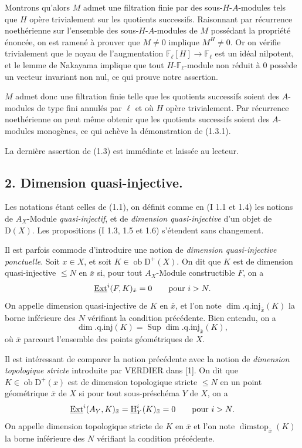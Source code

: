 \documentclass[11pt]{article}
\providecommand{\uH}{\underline{\mathrm H}}
\DeclareMathOperator{\Ext}{Ext}
\newcommand{\D}{\mathrm{D}}
\newcommand{\F}{\mathbb{F}}
\newcommand{\ob}{\operatorname{ob}}
\providecommand{\ob}{\operatorname{ob}}
\begin{document}
Montrons qu'alors $M$ admet une filtration finie par des sous-$H$-$A$-modules tels que $H$ opère trivialement sur les quotients successifs. Raisonnant par récurrence noethérienne sur l'ensemble des sous-$H$-$A$-modules de $M$ possédant la propriété énoncée, on est ramené à prouver que $M\neq0$ implique $M^H\neq0$. Or on vérifie trivialement que le noyau de l'augmentation $\F_\ell[H]\to\F_\ell$ est un idéal nilpotent, et le lemme de Nakayama implique que tout $H$-$\F_\ell$-module non réduit à $0$ possède un vecteur invariant non nul, ce qui prouve notre assertion.

$M$ admet donc une filtration finie telle que les quotients successifs soient des $A$-modules de type fini annulés par $\ell$ et où $H$ opère trivialement. Par récurrence noethérienne on peut même obtenir que les quotients successifs soient des $A$-modules monogènes, ce qui achève la démonstration de (1.3.1).

La dernière assertion de (1.3) est immédiate et laissée au lecteur.

\subsection*{2. Dimension quasi-injective.}

Les notations étant celles de (1.1), on définit comme en (I 1.1 et 1.4) les notions de $A_X$-Module \emph{quasi-injectif}, et de \emph{dimension quasi-injective} d'un objet de $\D(X)$. Les propositions (I 1.3, 1.5 et 1.6) s'étendent sans changement.

Il est parfois commode d'introduire une notion de \emph{dimension quasi-injective ponctuelle}. Soit $x\in X$, et soit $K\in\ob \D^+(X)$. On dit que $K$ est de dimension quasi-injective $\leq N$ en $\bar{x}$ si, pour tout $A_X$-Module constructible $F$, on a
\[
        \underline{\Ext}^{i}(F,K)_{\bar{x}}=0\qquad\hbox{pour }i>N.
\]
On appelle dimension quasi-injective de $K$ en $\bar{x}$, et l'on note $\dim.\mathrm{q.inj}_{\bar{x}}(K)$ la borne inférieure des $N$ vérifiant la condition précédente. Bien entendu, on a
\[
        \dim.\mathrm{q.inj}(K)=\operatorname{Sup}\dim.\mathrm{q.inj}_{\bar{x}}(K),
\]
où $\bar{x}$ parcourt l'ensemble des points géométriques de $X$.

Il est intéressant de comparer la notion précédente avec la notion de \emph{dimension topologique stricte} introduite par VERDIER dans [1]. On dit que $K\in\ob \D^+(x)$ est de dimension topologique stricte $\leq N$ en un point géométrique $\bar{x}$ de $X$ si pour tout sous-préschéma $Y$ de $X$, on a
\[
        \underline{\Ext}^{i}(A_Y,K)_{\bar{x}}=\uH^i_Y(K)_{\bar{x}}=0\qquad\hbox{pour }i>N.
\]
On appelle dimension topologique stricte de $K$ en $\bar{x}$ et l'on note $\operatorname{dimstop}_{\bar{x}}(K)$ la borne inférieure des $N$ vérifiant la condition précédente.
\end{document}
